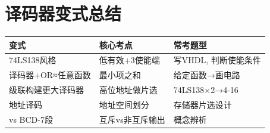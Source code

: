 \section{译码器变式总结}

\begin{examfocus}
\begin{center}
\begin{tabular}{|l|l|l|}
\hline
\textbf{变式} & \textbf{核心考点} & \textbf{常考题型} \\
\hline
74LS138风格 & 低有效+3使能端 & 写VHDL, 判断使能条件 \\
译码器+OR≈任意函数 & 最小项之和 & 给定函数→画电路 \\
级联构建更大译码器 & 高位地址做片选 & 74LS138×2→4-16 \\
地址译码 & 地址空间划分 & 存储器片选设计 \\
vs BCD-7段 & 互斥vs非互斥输出 & 概念辨析 \\
\hline
\end{tabular}
\end{center}
\end{examfocus}
